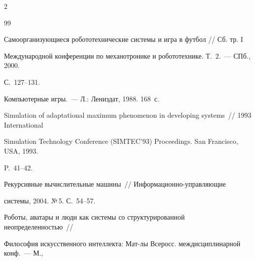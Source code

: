 \begin{multicols}{2}
{{\begin{thebibliography}{99}


















Самоорганизующиеся робототехнические сис\-те\-мы и игра в футбол // Сб. тр. I 


Международной конференции по механотронике и робототехнике. Т.~2.~--- СПб., 2000. 


С.~127--131.









Компьютерные игры.~--- Л.: Лениздат, 1988. 168~с.









Simulation of adaptational maximum phenomenon in developing systems~// 1993 International 


Simulation Technology Conference (SIMTEC'93) Proceedings. San Francisco, USA, 1993. 


P.~41--42.









Рекурсивные вычислительные машины~// Ин\-фор\-ма\-ци\-он\-но-управ\-ля\-ющие 


сис\-те\-мы, 2004. №\,5. С.~54--57.









Роботы, аватары и люди как сис\-те\-мы со структурированной неопределенностью~// 


Философия искусственного интеллекта: Мат-лы Всеросс. междисциплинарной конф.~--- М., 



\end{thebibliography}}}
\end{multicols}
